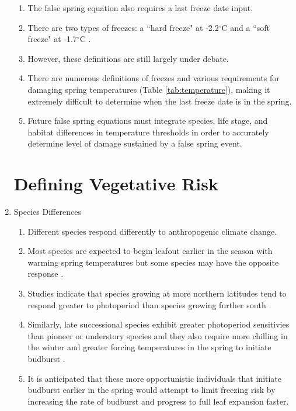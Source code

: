 \documentclass{article}\usepackage[]{graphicx}\usepackage[]{color}
\begin{document}
\begin{enumerate}
\begin{enumerate}
\item The false spring equation also requires a last freeze date input.
\item There are two types of freezes: a ``hard freeze" at -2.2$^{\circ}$C and a ``soft freeze" at -1.7$^{\circ}$C \citep{Vavrus2006, Kodra2011, Augspurger2013}.
\item However, these definitions are still largely under debate. 
\item There are numerous definitions of freezes and various requirements for damaging spring temperatures (Table \ref{tab:temperature}), making it extremely difficult to determine when the last freeze date is in the spring.
\item Future false spring equations must integrate species, life stage, and habitat differences in temperature thresholds in order to accurately determine level of damage sustained by a false spring event.
\end{enumerate}

\section*{Defining Vegetative Risk}
\item Species Differences
\begin {enumerate}
\item Different species respond differently to anthropogenic climate change.
\item Most species are expected to begin leafout earlier in the season with warming spring temperatures but some species may have the opposite response \citep{Cleland2006, Yu2010, Xin2016}.
\item Studies indicate that species growing at more northern latitudes tend to respond greater to photoperiod than species growing further south \citep {Partanen2004, Viheraaarnio2006, Caffarra2011}.
\item Similarly, late successional species exhibit greater photoperiod sensitivies than pioneer or understory species \citep{Basler2012} and they also require more chilling in the winter and greater forcing temperatures in the spring to initiate budburst \citep{Laube2013}.
\item It is anticipated that these more opportunistic individuals that initiate budburst earlier in the spring would attempt to limit freezing risk by increasing the rate of budburst and progress to full leaf expansion faster.
\end{enumerate}


\end{enumerate}
\end{document}
